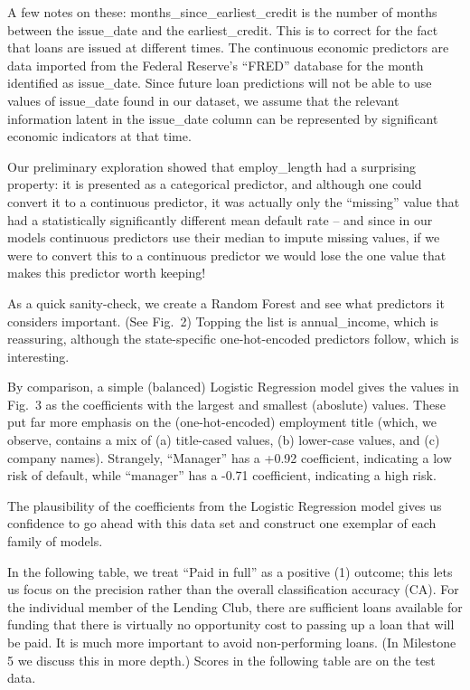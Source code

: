A few notes on these: months\_since\_earliest\_credit is the number of months between the issue\_date and the earliest\_credit. This is to correct for the fact that loans are issued at different times. The continuous economic predictors are data imported from the Federal Reserve's ``FRED'' database for the month identified as issue\_date. Since future loan predictions will not be able to use values of issue\_date found in our dataset, we assume that the relevant information latent in the issue\_date column can be represented by significant economic indicators at that time. 

Our preliminary exploration showed that employ\_length had a surprising property: it is presented as a categorical predictor, and although one could convert it to a continuous predictor, it was actually only the ``missing'' value that had a statistically significantly different mean default rate -- and since in our models continuous predictors use their median to impute missing values, if we were to convert this to a continuous predictor we would lose the one value that makes this predictor worth keeping!

As a quick sanity-check, we create a Random Forest and see what predictors it considers important. (See Fig.~2) Topping the list is annual\_income, which is reassuring, although the state-specific one-hot-encoded predictors follow, which is interesting. 

By comparison, a simple (balanced) Logistic Regression model gives the values in Fig.~3 as the coefficients with the largest and smallest (aboslute) values. These put far more emphasis on the (one-hot-encoded) employment title (which, we observe, contains a mix of (a) title-cased values, (b) lower-case values, and (c) company names). Strangely, ``Manager'' has a +0.92 coefficient, indicating a low risk of default, while ``manager'' has a -0.71 coefficient, indicating a high risk.

The plausibility of the coefficients from the Logistic Regression model gives us confidence to go ahead with this data set and construct one exemplar of each family of models.

In the following table, we treat ``Paid in full'' as a positive (1) outcome; this lets us focus on the precision rather than the overall classification accuracy (CA). For the individual member of the Lending Club, there are sufficient loans available for funding that there is virtually no opportunity cost to passing up a loan that will be paid. It is much more important to avoid non-performing loans. (In Milestone 5 we discuss this in more depth.) Scores in the following table are on the test data.

